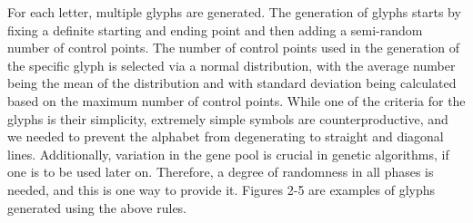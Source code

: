 \documentclass{vgtc}                          %
\begin{document}
For each letter, multiple glyphs are generated. The generation of glyphs starts by fixing a definite starting and ending point and then adding a semi-random number of control points. The number of control points used in the generation of the specific glyph is selected via a normal distribution, with the average number being the mean of the distribution and with standard deviation being calculated based on the maximum number of control points. While one of the criteria for the glyphs is their
simplicity, extremely simple symbols are counterproductive, and we needed to prevent the alphabet from degenerating to straight and diagonal lines. Additionally, variation in the gene pool is crucial in genetic algorithms, if one is to be used later on. Therefore, a degree of randomness in all phases is needed, and this is one way to provide it. Figures 2-5 are examples of glyphs generated using the above rules.
\end{document}
